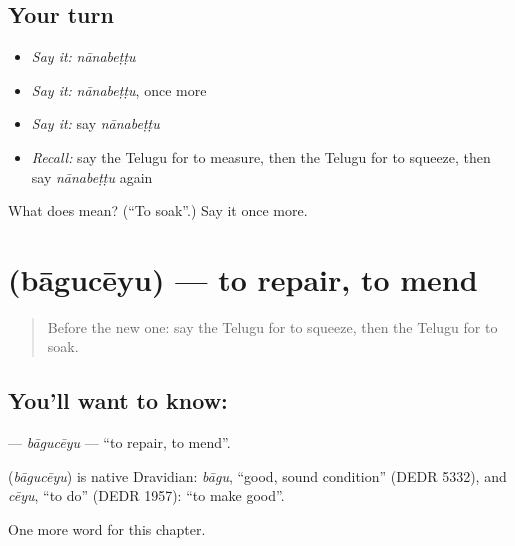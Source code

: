 \subsection*{Your turn}
\begin{itemize}
\raggedright
  \item \emph{Say it:} \emph{nānabeṭṭu}
  \item \emph{Say it:} \emph{nānabeṭṭu}, once more
  \item \emph{Say it:} say \emph{nānabeṭṭu}
  \item \emph{Recall:} say the Telugu for to measure, then the Telugu for to squeeze, then say \emph{nānabeṭṭu} again
\end{itemize}

\begin{tcolorbox}[breakable,colback=teal!4,colframe=teal!35!black,title={Before you move on}]
What does  mean? (\textquotedblleft{}To soak\textquotedblright{}.) Say it once more.
\end{tcolorbox}
\section[\texorpdfstring{\te{బాగుచేయు} (bāgucēyu)}{బాగుచేయు (bāgucēyu)}]{ (bāgucēyu) — to repair, to mend}

\label{lesson:TE-C159-baguceyu}



\begin{quote}
Before the new one: say the Telugu for to squeeze, then the Telugu for to soak.
\end{quote}

\subsection*{You'll want to know: }
\textbf{} — \emph{bāgucēyu} — \textquotedblleft{}to repair, to mend\textquotedblright{}.

\begin{cousinweb}
\textbf{} (\emph{bāgucēyu}) is native Dravidian: \emph{bāgu}, \textquotedblleft{}good, sound condition\textquotedblright{} (DEDR 5332), and \emph{cēyu}, \textquotedblleft{}to do\textquotedblright{} (DEDR 1957): \textquotedblleft{}to make good\textquotedblright{}.
\end{cousinweb}

\begin{grammarlens}[title={What you've built}]
One more word for this chapter.
\end{grammarlens}

